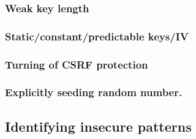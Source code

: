 \subsubsection{Weak key length}
\subsubsection{Static/constant/predictable keys/IV }
\subsubsection{Turning of CSRF protection }
\subsubsection{Explicitly seeding random number.}
\subsection{Identifying insecure patterns}

